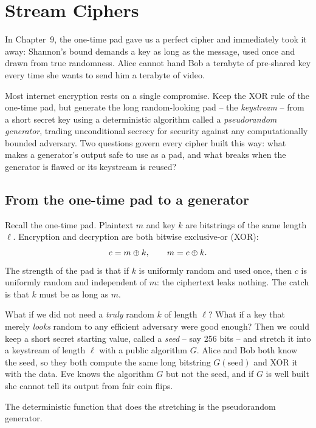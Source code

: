 \chapter{Stream Ciphers}

In Chapter~9, the one-time pad gave us a perfect cipher and immediately took it away: Shannon's bound demands a key as long as the message, used once and drawn from true randomness. Alice cannot hand Bob a terabyte of pre-shared key every time she wants to send him a terabyte of video.

Most internet encryption rests on a single compromise. Keep the XOR rule of the one-time pad, but generate the long random-looking pad -- the \emph{keystream} -- from a short secret key using a deterministic algorithm called a \emph{pseudorandom generator}, trading unconditional secrecy for security against any computationally bounded adversary. Two questions govern every cipher built this way: what makes a generator's output safe to use as a pad, and what breaks when the generator is flawed or its keystream is reused?

\section{From the one-time pad to a generator}
\label{ch10:from-otp}

Recall the one-time pad. Plaintext $m$ and key $k$ are bitstrings of the same length $\ell$. Encryption and decryption are both bitwise exclusive-or (XOR):
\[
  c = m \oplus k, \qquad m = c \oplus k .
\]
The strength of the pad is that if $k$ is uniformly random and used once, then $c$ is uniformly random and independent of $m$: the ciphertext leaks nothing. The catch is that $k$ must be as long as $m$.

\begin{intuitionbox}
What if we did not need a \emph{truly} random $k$ of length $\ell$? What if a key that merely \emph{looks} random to any efficient adversary were good enough? Then we could keep a short secret starting value, called a \emph{seed} -- say 256 bits -- and stretch it into a keystream of length $\ell$ with a public algorithm $G$. Alice and Bob both know the seed, so they both compute the same long bitstring $G(\text{seed})$ and XOR it with the data. Eve knows the algorithm $G$ but not the seed, and if $G$ is well built she cannot tell its output from fair coin flips.
\end{intuitionbox}

The deterministic function that does the stretching is the pseudorandom generator.

